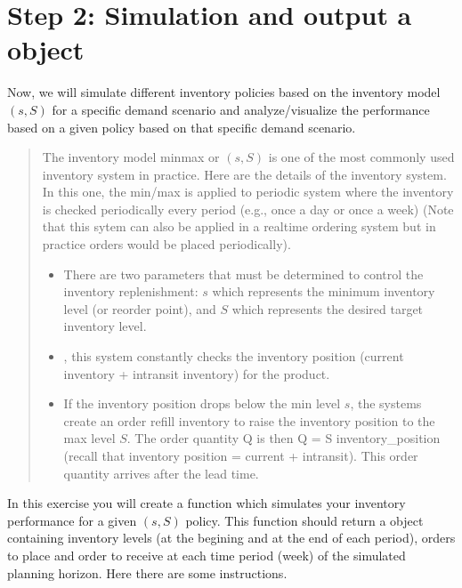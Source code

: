 \documentclass[letterpaper,10pt,english]{jupyterBook}
\begin{document}
\section{Step 2: Simulation and output a  object}
\label{\detokenize{docs/Ex_Lecture_Demo_Inventory_Sim:step-2-simulation-and-output-a-dataframe-object}}
\sphinxAtStartPar
Now, we will simulate different inventory policies based on the inventory model \((s,S)\) for a specific demand scenario and analyze/visualize the performance based on a given policy based on that specific demand scenario.
\begin{quote}

\sphinxAtStartPar
The inventory model min\sphinxhyphen{}max or \((s,S)\) is one of the most commonly used inventory system in practice. Here are the details of the inventory system. In this one, the min/max is applied to periodic system where the inventory is checked periodically every period (e.g., once a day or once a week) (Note that this sytem can also be applied in a real\sphinxhyphen{}time ordering system but in practice orders would be placed periodically).
\begin{itemize}
\item {} 
\sphinxAtStartPar
There are two parameters that must be determined to control the inventory replenishment: \(s\) which represents the minimum inventory level (or reorder point), and \(S\) which represents the desired target inventory level.

\item {} 
\sphinxAtStartPar
{}, this system constantly checks the inventory position (current inventory + in\sphinxhyphen{}transit inventory) for the product.

\item {} 
\sphinxAtStartPar
If the inventory position drops below the min level \(s\), the systems create an order refill inventory to raise the inventory position to the max level \(S\). The order quantity Q is then Q = S \sphinxhyphen{} inventory\_position (recall that inventory position = current + in\sphinxhyphen{}transit). This order quantity arrives after the lead time.

\end{itemize}
\end{quote}

\sphinxAtStartPar
In this exercise you will create a function which simulates your inventory performance for a given \((s,S)\) policy. This function should return a  object containing inventory levels (at the begining and at the end of each period), orders to place and order to receive at each time period (week) of the simulated planning horizon. Here there are some instructions.
\end{document}
